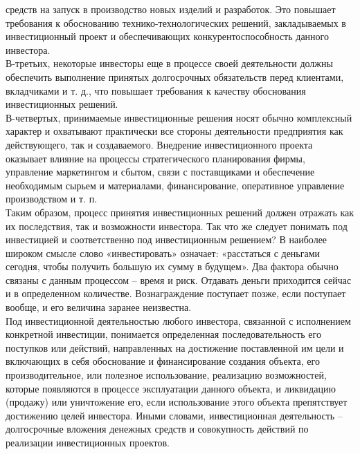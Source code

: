 \documentclass[a4paper,12pt]{article}
\begin{document}
средств на запуск в производство новых изделий и разработок. Это повышает требования к обоснованию технико-технологических решений, закладываемых в инвестиционный проект и обеспечивающих конкурентоспособность данного инвестора.\\
В-третьих, некоторые инвесторы еще в процессе своей деятельности
должны обеспечить выполнение принятых долгосрочных обязательств перед клиентами, вкладчиками и т. д., что повышает требования к качеству
обоснования инвестиционных решений.\\
В-четвертых, принимаемые инвестиционные решения носят обычно
комплексный характер и охватывают практически все стороны деятельности предприятия как действующего, так и создаваемого. Внедрение инвестиционного проекта оказывает влияние на процессы стратегического
планирования фирмы, управление маркетингом и сбытом, связи с поставщиками и обеспечение необходимым сырьем и материалами, финансирование, оперативное управление производством и т. п.\\
Таким образом, процесс принятия инвестиционных решений должен
отражать как их последствия, так и возможности инвестора.
Так что же следует понимать под инвестицией и соответственно под
инвестиционным решением? В наиболее широком смысле слово «инвестировать» означает: «расстаться с деньгами сегодня, чтобы получить
большую их сумму в будущем». Два фактора обычно связаны с данным
процессом – время и риск. Отдавать деньги приходится сейчас и в определенном количестве. Вознаграждение поступает позже, если поступает вообще, и его величина заранее неизвестна.\\
Под инвестиционной деятельностью любого инвестора, связанной с
исполнением конкретной инвестиции, понимается определенная последовательность его поступков или действий, направленных на достижение
поставленной им цели и включающих в себя обоснование и финансирование создания объекта, его производительное, или полезное использование,
реализацию возможностей, которые появляются в процессе эксплуатации
данного объекта, и ликвидацию (продажу) или уничтожение его, если использование этого объекта препятствует достижению целей инвестора.
Иными словами, инвестиционная деятельность – долгосрочные вложения денежных средств и совокупность действий по реализации инвестиционных проектов.
\end{document}
